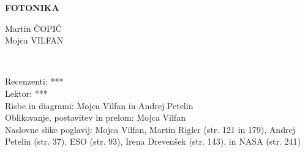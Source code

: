 \documentclass[11pt,fleqn]{book} %
\begin{document}
\let\cleardoublepage\clearpage
\makeatletter
\setlength{\@fptop}{0pt}
\makeatother




\begingroup
\thispagestyle{empty}
\centering
\vspace*{5cm}
\par\normalfont\fontsize{35}{35}\sffamily\selectfont
\textbf{FOTONIKA}\\
{\LARGE }\par %
\vspace*{1cm}
\vspace*{1cm}
\vspace*{8cm}
{\Large Martin ČOPIČ \\Mojca VILFAN \\}\par %
\endgroup


\newpage
~\vfill
\thispagestyle{empty}


 Recenzenti: {***}\\ %

 Lektor: {***}\\ %

 Risbe in diagrami: Mojca Vilfan in Andrej Petelin\\ %
 
 Oblikovanje, postavitev in prelom: Mojca Vilfan \\ %

 Naslovne slike poglavij: Mojca Vilfan, Martin Rigler (str. 121 in 179), Andrej Petelin (str. 37),
 ESO (str. 93), Irena Drevenšek (str. 143), in NASA (str. 241)\\ %
\end{document}
